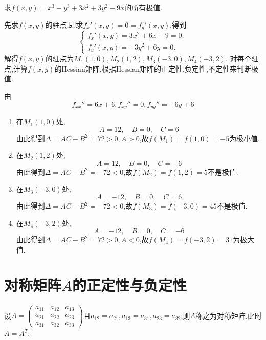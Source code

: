 \begin{example}
    求$f(x,y) = x^3-y^3+3x^2+3y^2-9x$的所有极值.
\end{example}

\begin{solution}
    先求$f(x,y)$的驻点,即求$f_x'(x,y) = 0 = f_y'(x,y)$,得到
    $$\begin{cases}
        f_x'(x,y) = 3x^2 + 6x - 9 = 0,\\
        f_y'(x,y) = -3y^2 + 6y = 0.
    \end{cases}$$
    解得$f(x,y)$的驻点为$M_1(1,0),M_2(1,2),M_3(-3,0),M_4(-3,2)$.
    对每个驻点,计算$f(x,y)$的Hessian矩阵,根据Hessian矩阵的正定性,负定性,不定性来判断极值.

    由$$f_{xx}''=6x+6, f_{xy}''=0, f_{yy}''=-6y+6$$
    \begin{enumerate}
        \item 在$M_1(1,0)$处,
        $$A = 12, \quad B = 0, \quad C = 6$$
        由此得到$\Delta = AC - B^2 = 72 > 0,A>0$,故$f(M_1) = f(1,0) = -5$为极小值.
        \item 在$M_2(1,2)$处,
        $$A = 12, \quad B = 0, \quad C = -6$$
        由此得到$\Delta = AC - B^2 = -72 < 0$,故$f(M_2) = f(1,2) = 5$不是极值.
        \item 在$M_3(-3,0)$处,
        $$A = -12, \quad B = 0, \quad C = 6$$
        由此得到$\Delta = AC - B^2 = -72 < 0$,故$f(M_3) = f(-3,0) = 45$不是极值.
        \item 在$M_4(-3,2)$处,
        $$A = -12, \quad B = 0, \quad C = -6$$
        由此得到$\Delta = AC - B^2 = 72 > 0,A<0$,故$f(M_4) = f(-3,2) = 31$为极大值.
    \end{enumerate}
\end{solution}










\section{对称矩阵$A$的正定性与负定性}

\begin{definition}
    [对称矩阵]

    设$A = \begin{pmatrix}
    a_{11} & a_{12} & a_{13}\\
    a_{21} & a_{22} & a_{23}\\
    a_{31} & a_{32} & a_{33}
\end{pmatrix}$且$a_{12} = a_{21}, a_{13} = a_{31}, a_{23} = a_{32}$,则$A$称之为对称矩阵,此时$A = A^T$.
\end{definition}

